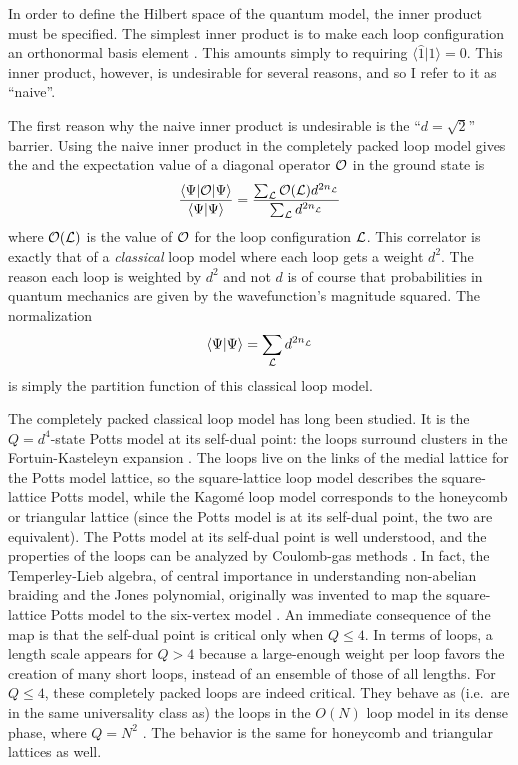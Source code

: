 \documentclass[11pt]{article}
\newcommand{\xxl}{\langle\widehat{1}}
\begin{document}
In order to define the Hilbert space of the quantum model, the inner
product must be specified. The simplest inner product is to make each
loop configuration an orthonormal basis element
\cite{Freedman01}. This amounts simply to requiring $\xxl | 1\rangle =0$.
This inner product, however, is undesirable for several reasons, and
so I refer to it as ``naive''.  

The first reason why the naive inner product is undesirable is the
``$d=\sqrt{2}$'' barrier. 
Using the naive inner product in the
completely packed loop model gives the
and the expectation value of a diagonal operator ${\cal O}$ in
the ground state is 
\begin{equation}
\frac{\langle\Psi|{\cal O} |\Psi\rangle}{\langle\Psi|\Psi\rangle}
=\frac{\sum_{\cal L} {\cal O}({\cal L}) d^{2n^{}_{\cal L}} }
{\sum_{\cal L} d^{2n^{}_{\cal L}} }
\end{equation}
where ${\cal O}({\cal L})$ is the value of ${\cal O}$ for the loop
configuration ${\cal L}$. This correlator is exactly that of a {\em
classical} loop model where each loop gets a weight $d^2$. The reason
each loop is weighted by $d^2$ and not $d$ is of course that
probabilities in quantum mechanics are given by the wavefunction's
magnitude squared.  The normalization
\begin{equation}
 \langle \Psi| \Psi\rangle= \sum_{\cal L} d^{2n^{}_{\cal L}}
\label{Zloop}
\end{equation}
is simply the partition function of this classical loop
model.

The completely packed classical loop model has long been studied. It
is the $Q=d^4$-state Potts model at its self-dual point: the loops
surround clusters in the Fortuin-Kasteleyn expansion \cite{FK}. The
loops live on the links of the medial lattice for the Potts model
lattice, so the square-lattice loop model describes the square-lattice
Potts model, while the Kagom\'e loop model corresponds to the
honeycomb or triangular lattice (since the Potts model is at its
self-dual point, the two are equivalent).  The Potts model at its
self-dual point is well understood, and the properties of the loops
can be analyzed by Coulomb-gas methods \cite{Nienhuis}. In fact, the
Temperley-Lieb algebra, of central importance in understanding
non-abelian braiding and the Jones polynomial, originally was invented
to map the square-lattice Potts model to the six-vertex model
\cite{TL}. An immediate consequence of the map is that the self-dual
point is critical only when $Q\le 4$. In terms of loops, a length
scale appears for $Q>4$ because a large-enough weight per loop favors
the creation of many short loops, instead of an ensemble of those of
all lengths. For $Q\le 4$, these completely packed loops are indeed
critical. They behave as (i.e.\ are in the same universality class as)
the loops in the $O(N)$ loop model in its dense phase, where $Q=N^2$
\cite{Nienhuis}. The behavior is the same for honeycomb and triangular
lattices as well.
\end{document}
